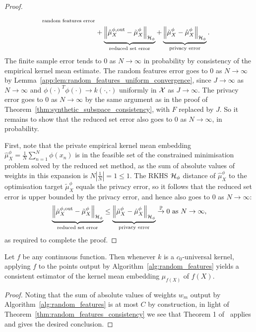 \begin{hthm}[\ref{thm:random_features_consistency}]
\begin{proof}
\begin{align}
{		}_{\text{random features error}}
		\nonumber\\&+
		\underbrace{
			\left\| \hat{\mu}^{\phi, \text{out}}_X - \tilde{\mu}^{\phi}_X \right\|_{\mathcal{H}_{\phi}}
		}_{\text{reduced set error}}
		+
		\underbrace{
			\left\| \tilde{\mu}^{\phi}_X - \hat{\mu}^{\phi}_X \right\|_{\mathcal{H}_{\phi}}
		}_{\text{privacy error}}
		.
		\label{app:eq:alg2_error_decomposition}
		\end{align}
		The finite sample error tends to $0$ as $N \to \infty$ in probability by consistency of the empirical kernel mean estimate. The random features error goes to $0$ as $N \to \infty$ by Lemma~\ref{app:lem:random_features_uniform_convergence}, since $J \to \infty$ as $N \to \infty$ and $\phi(\cdot)^T \phi(\cdot) \to k(\cdot, \cdot)$ uniformly in $\mathcal{X}$ as $J \to \infty$. The privacy error goes to $0$ as $N \to \infty$ by the same argument as in the proof of Theorem~\ref{thm:synthetic_subspace_consistency}, with $F$ replaced by $J$. So it remains to show that the reduced set error also goes to $0$ as $N \to \infty$, in probability.
		
		First, note that the private empirical kernel mean embedding $\hat{\mu}_X^{\phi} = \frac{1}{N} \sum_{n = 1}^N \phi(x_n)$ is in the feasible set of the constrained minimisation problem solved by the reduced set method, as the sum of absolute values of weights in this expansion is $N | \frac{1}{N} | = 1 \leq 1$. The RKHS $\mathcal{H}_{\phi}$ distance of $\hat{\mu}_X^{\phi}$ to the optimisation target $\tilde{\mu}^{\phi}_X$ equals the privacy error, so it follows that the reduced set error is upper bounded by the privacy error, and hence also goes to $0$ as $N \to \infty$:
		\begin{equation}
		\underbrace{
			\left\| \hat{\mu}^{\phi, \text{out}}_X - \tilde{\mu}^{\phi}_X \right\|_{\mathcal{H}_{\phi}}
		}_{\text{reduced set error}}
		\leq
		\underbrace{
			\left\| \tilde{\mu}^{\phi}_X - \hat{\mu}^{\phi}_X \right\|_{\mathcal{H}_{\phi}}
		}_{\text{privacy error}}
		\stackrel{\mathbb{P}}{\to} 0 \text{ as } N \to \infty
		,
		\end{equation}
		as required to complete the proof.
	\end{proof}
\end{hthm}


\begin{corollary}
	Let $f$ be any continuous function. Then whenever $k$ is a $c_0$-universal kernel, applying $f$ to the points output by Algorithm~\ref{alg:random_features} yields a consistent estimator of the kernel mean embedding $\mu_{f(X)}$ of $f(X)$.
	\begin{proof}
		Noting that the sum of absolute values of weights $w_m$ output by Algorithm~\ref{alg:random_features} is at most $C$ by construction, in light of Theorem~\ref{thm:random_features_consistency} we see that Theorem 1 of~\cite{scibior_consistent_2016} applies and gives the desired conclusion.
	\end{proof}
\end{corollary}



